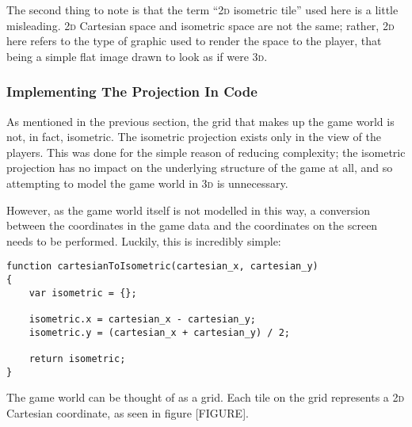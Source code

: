 The second thing to note is that the term ``\textsc{2d} isometric tile'' used here is a little misleading. \textsc{2d} Cartesian space and isometric space are not the same; rather, \textsc{2d} here refers to the type of graphic used to render the space to the player, that being a simple flat image drawn to look as if were \textsc{3d}.

\subsubsection{Implementing The Projection In Code}
As mentioned in the previous section, the grid that makes up the game world is not, in fact, isometric. The isometric projection exists only in the view of the players. This was done for the simple reason of reducing complexity; the isometric projection has no impact on the underlying structure of the game at all, and so attempting to model the game world in \textsc{3d} is unnecessary.

However, as the game world itself is not modelled in this way, a conversion between the coordinates in the game data and the coordinates on the screen needs to be performed. Luckily, this is incredibly simple:

\begin{lstlisting}[style=js, caption={JavaScript function to turn Cartesian coordinates into game isometric coordinates. Original algorithm from \cite{citeulike:13155325}.}, label=cartesian_to_isometric]
function cartesianToIsometric(cartesian_x, cartesian_y)
{
	var isometric = {};

    isometric.x = cartesian_x - cartesian_y;
    isometric.y = (cartesian_x + cartesian_y) / 2;

    return isometric;
}
\end{lstlisting}

The game world can be thought of as a grid. Each tile on the grid represents a \textsc{2d} Cartesian coordinate, as seen in figure [FIGURE].



